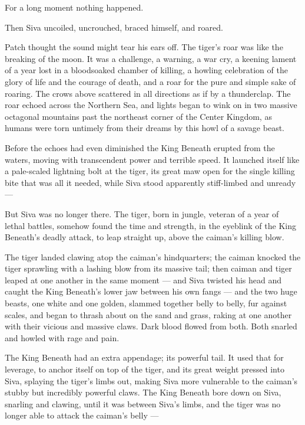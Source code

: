 \documentclass[ebook,oneside,openany,17pt]{memoir}
\newenvironment{tolerant}[1]{%
  \par\tolerance=#1\relax
}{%
  \par
}
\begin{document}
For a long moment nothing happened.

Then Siva uncoiled, uncrouched, braced himself, and roared.

Patch thought the sound might tear his ears off. The tiger’s roar was
like the breaking of the moon. It was a challenge, a warning, a war
cry, a keening lament of a year lost in a bloodsoaked chamber of
killing, a howling celebration of the glory of life and the courage of
death, and a roar for the pure and simple sake of roaring. The crows
above scattered in all directions as if by a thunderclap. The roar
echoed across the Northern Sea, and lights began to wink on in two
massive octagonal mountains past the northeast corner of the Center
Kingdom, as humans were torn untimely from their dreams by this howl
of a savage beast.

Before the echoes had even diminished the King Beneath erupted from
the waters, moving with transcendent power and terrible speed. It
launched itself like a pale-scaled lightning bolt at the tiger, its
great maw open for the single killing bite that was all it needed,
while Siva stood apparently stiff-limbed and unready —

But Siva was no longer there. The tiger, born in jungle, veteran of a
year of lethal battles, somehow found the time and strength, in the
eyeblink of the King Beneath’s deadly attack, to leap straight up,
above the caiman’s killing blow.

\begin{tolerant}{500}
The tiger landed clawing atop the caiman’s hind\-quarters; the caiman
knocked the tiger sprawling with a lashing blow from its massive tail;
then cai\-man and tiger leaped at one another in the same moment — and
Siva twisted his head and caught the King Beneath’s lower jaw between
his own fangs — and the two huge beasts, one white and one golden,
slammed together belly to belly, fur against scales, and began to
thrash about on the sand and grass, raking at one another with their
vicious and massive claws. Dark blood flowed from both. Both snarled
and howled with rage and pain.
\end{tolerant}

The King Beneath had an extra appendage; its powerful tail. It used
that for leverage, to anchor itself on top of the tiger, and its great
weight pressed into Siva, splaying the tiger’s limbs out, making Siva
more vulnerable to the caiman’s stubby but incredibly powerful
claws. The King Beneath bore down on Siva, snarling and clawing, until
it was between Siva’s limbs, and the tiger was no longer able to
attack the caiman’s belly —
\end{document}
